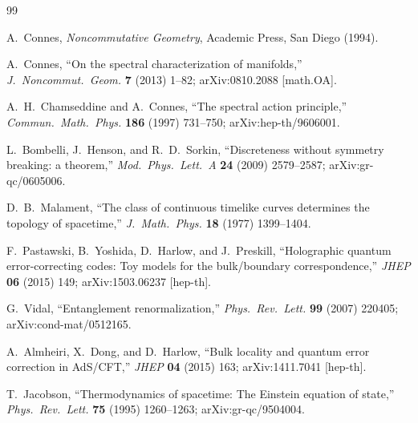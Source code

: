 \documentclass[12pt,a4paper]{article}
\theoremstyle{postulate}
\begin{document}
\begin{thebibliography}{99}

A.~Connes,
\textit{Noncommutative Geometry},
Academic Press, San Diego (1994).

A.~Connes,
``On the spectral characterization of manifolds,''
\textit{J.\ Noncommut.\ Geom.} \textbf{7} (2013) 1--82;
arXiv:0810.2088 [math.OA].

A.~H.~Chamseddine and A.~Connes,
``The spectral action principle,''
\textit{Commun.\ Math.\ Phys.} \textbf{186} (1997) 731--750;
arXiv:hep-th/9606001.

L.~Bombelli, J.~Henson, and R.~D.~Sorkin,
``Discreteness without symmetry breaking: a theorem,''
\textit{Mod.\ Phys.\ Lett.\ A} \textbf{24} (2009) 2579--2587;
arXiv:gr-qc/0605006.

D.~B.~Malament,
``The class of continuous timelike curves determines the topology
of spacetime,''
\textit{J.\ Math.\ Phys.} \textbf{18} (1977) 1399--1404.

F.~Pastawski, B.~Yoshida, D.~Harlow, and J.~Preskill,
``Holographic quantum error-correcting codes: Toy models for the
bulk/boundary correspondence,''
\textit{JHEP} \textbf{06} (2015) 149;
arXiv:1503.06237 [hep-th].

G.~Vidal,
``Entanglement renormalization,''
\textit{Phys.\ Rev.\ Lett.} \textbf{99} (2007) 220405;
arXiv:cond-mat/0512165.

A.~Almheiri, X.~Dong, and D.~Harlow,
``Bulk locality and quantum error correction in AdS/CFT,''
\textit{JHEP} \textbf{04} (2015) 163;
arXiv:1411.7041 [hep-th].

T.~Jacobson,
``Thermodynamics of spacetime: The Einstein equation of state,''
\textit{Phys.\ Rev.\ Lett.} \textbf{75} (1995) 1260--1263;
arXiv:gr-qc/9504004.

\end{thebibliography}
\end{document}
